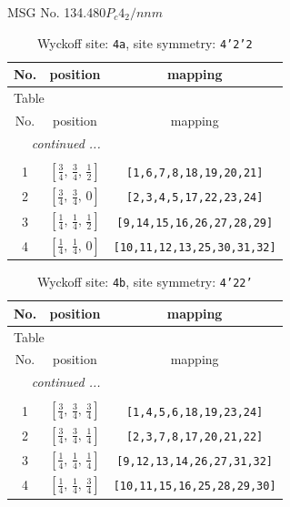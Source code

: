 \documentclass[fleqn,8pt]{jsarticle}
\begin{document}
\setcounter{MaxMatrixCols}{32}

\renewcommand{\tablename}{Table~}
\renewcommand{\figurename}{Figure~}
\begin{center}
\LARGE
MSG No. 134.480\quad$P_{c}4_{2}/nnm$
\end{center}
\renewcommand{\arraystretch}{1.2}
\begin{longtable}{ccc}
\caption{Wyckoff site: {\tt 4a}, site symmetry: {\tt 4'2'2}}
 \\
 \hline \hline
No. & position & mapping \\ \hline \endfirsthead

\multicolumn{2}{l}{\tablename\ \thetable{}} \\
 \hline \hline
No. & position & mapping \\ \hline \endhead

 \hline \hline
\multicolumn{2}{r}{\footnotesize\it continued ...} \\ \endfoot

 \hline \hline
\multicolumn{2}{r}{} \\ \endlastfoot

1 & $\left[ \frac{3}{4},\, \frac{3}{4},\, \frac{1}{2} \right]$ & {\tt [1,6,7,8,18,19,20,21]} \\ \hline
2 & $\left[ \frac{3}{4},\, \frac{3}{4},\, 0 \right]$ & {\tt [2,3,4,5,17,22,23,24]} \\ \hline
3 & $\left[ \frac{1}{4},\, \frac{1}{4},\, \frac{1}{2} \right]$ & {\tt [9,14,15,16,26,27,28,29]} \\ \hline
4 & $\left[ \frac{1}{4},\, \frac{1}{4},\, 0 \right]$ & {\tt [10,11,12,13,25,30,31,32]} \\
\end{longtable}
\renewcommand{\arraystretch}{1.2}
\begin{longtable}{ccc}
\caption{Wyckoff site: {\tt 4b}, site symmetry: {\tt 4'22'}}
 \\
 \hline \hline
No. & position & mapping \\ \hline \endfirsthead

\multicolumn{2}{l}{\tablename\ \thetable{}} \\
 \hline \hline
No. & position & mapping \\ \hline \endhead

 \hline \hline
\multicolumn{2}{r}{\footnotesize\it continued ...} \\ \endfoot

 \hline \hline
\multicolumn{2}{r}{} \\ \endlastfoot

1 & $\left[ \frac{3}{4},\, \frac{3}{4},\, \frac{3}{4} \right]$ & {\tt [1,4,5,6,18,19,23,24]} \\ \hline
2 & $\left[ \frac{3}{4},\, \frac{3}{4},\, \frac{1}{4} \right]$ & {\tt [2,3,7,8,17,20,21,22]} \\ \hline
3 & $\left[ \frac{1}{4},\, \frac{1}{4},\, \frac{1}{4} \right]$ & {\tt [9,12,13,14,26,27,31,32]} \\ \hline
4 & $\left[ \frac{1}{4},\, \frac{1}{4},\, \frac{3}{4} \right]$ & {\tt [10,11,15,16,25,28,29,30]} \\
\end{longtable}
\end{document}

